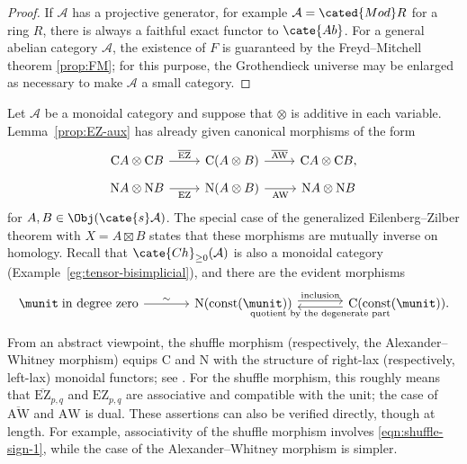 \begin{proof}
	If $\mathcal{A}$ has a projective generator, for example
	$\mathcal{A}=\cated{Mod}R$ for a ring $R$, there is always a faithful
	exact functor to $\cate{Ab}$. For a general abelian category
	$\mathcal{A}$, the existence of $F$ is guaranteed by the Freyd--Mitchell
	theorem \ref{prop:FM}; for this purpose, the Grothendieck universe may be
	enlarged as necessary to make $\mathcal{A}$ a small category.
\end{proof}

\begin{remark}
	Let $\mathcal{A}$ be a monoidal category and suppose that $\otimes$ is
	additive in each variable. Lemma~\ref{prop:EZ-aux} has already given
	canonical morphisms of the form
	\[\begin{tikzcd}[row sep=tiny]
		\mathrm{C}A \otimes \mathrm{C}B \arrow[r, "{\overline{\mathrm{EZ}}}"] & \mathrm{C}(A \otimes B) \arrow[r, "{\overline{\mathrm{AW}}}"] & \mathrm{C}A \otimes \mathrm{C}B, \\
		\mathrm{N}A \otimes \mathrm{N}B \arrow[r, "\mathrm{EZ}"'] & \mathrm{N}(A \otimes B) \arrow[r, "{\mathrm{AW}}"'] & \mathrm{N}A \otimes \mathrm{N}B
	\end{tikzcd}\]
	for $A,B\in\Obj(\cate{s}\mathcal{A})$. The special case of the
	generalized Eilenberg--Zilber theorem with $X=A\boxtimes B$ states that
	these morphisms are mutually inverse on homology. Recall that
	$\cate{Ch}_{\geq0}(\mathcal{A})$ is also a monoidal category
	(Example~\ref{eg:tensor-bisimplicial}), and there are the evident morphisms
	\[\begin{tikzcd}[column sep=large]
		\munit \;\text{in degree zero} \arrow[r, "\sim"] & \mathrm{N}(\mathrm{const}(\munit)) \arrow[shift left, r, "\text{inclusion}"] & \mathrm{C}(\mathrm{const}(\munit)). \arrow[shift left, l, "\text{quotient by the degenerate part}"]
	\end{tikzcd}\]

	From an abstract viewpoint, the shuffle morphism (respectively, the
	Alexander--Whitney morphism) equips $\mathrm{C}$ and $\mathrm{N}$ with
	the structure of right-lax (respectively, left-lax) monoidal functors; see
	\cite[Remark 3.1.8]{Li1}. For the shuffle morphism, this roughly means
	that $\overline{\mathrm{EZ}}_{p,q}$ and $\mathrm{EZ}_{p,q}$ are
	associative and compatible with the unit; the case of
	$\overline{\mathrm{AW}}$ and $\mathrm{AW}$ is dual. These assertions can
	also be verified directly, though at length. For example, associativity
	of the shuffle morphism involves \eqref{eqn:shuffle-sign-1}, while the
	case of the Alexander--Whitney morphism is simpler.


\end{remark}
